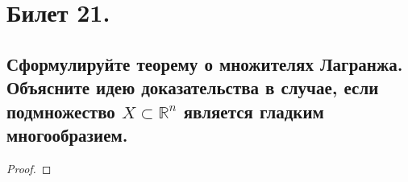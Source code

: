 \section{Билет 21.}

\subsection{Сформулируйте теорему о множителях Лагранжа. Объясните идею доказательства в случае, если подмножество  $X \subset \mathbb{R}^n$ является гладким многообразием.}
\begin{theorem}
    \begin{proof}
        
    \end{proof}
\end{theorem}